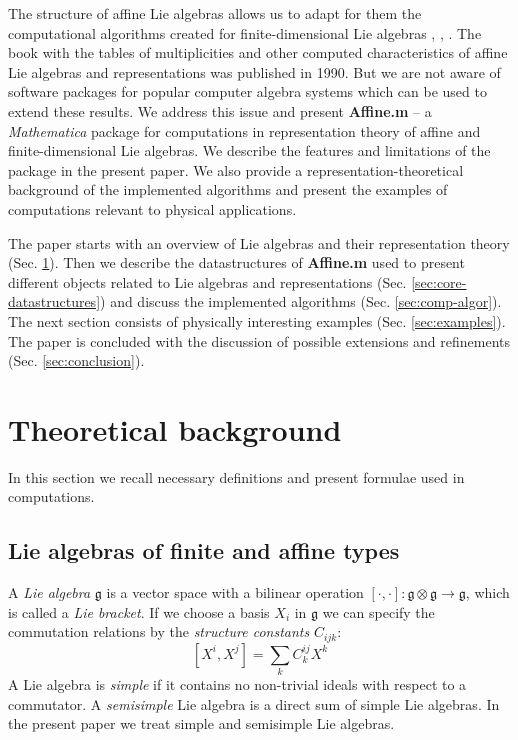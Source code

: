 \documentclass[preprint,12pt]{elsarticle}
\newcommand{\gf}{\mathfrak{g}}
\begin{document}
The structure of affine Lie algebras allows us to adapt for them the computational algorithms created for finite-dimensional Lie algebras  \cite{Fuchs:1996dd}, \cite{gannon2001algorithms}, \cite{kass1990ala}. The book \cite{kass1990ala} with the tables of multiplicities and other computed characteristics of affine Lie algebras and representations was published in 1990. But we are not aware of software packages for popular computer algebra systems which can be used to extend these results.
We address this issue and present {\bf Affine.m} -- a {\it Mathematica} package for computations in representation theory of affine and finite-dimensional Lie algebras.  We describe the features and limitations of the package in the present paper.  We also provide a representation-theoretical background of the implemented algorithms and present the examples of computations relevant to physical applications.

The paper starts with an overview of Lie algebras and their representation theory (Sec. \ref{sec:theor-backgr}). Then we describe the datastructures of {\bf Affine.m} used to present different objects related to Lie algebras and representations (Sec. \ref{sec:core-datastructures}) and discuss the implemented algorithms (Sec. \ref{sec:comp-algor}). The next section consists of physically interesting examples (Sec. \ref{sec:examples}). The paper is concluded with the discussion of possible extensions and refinements (Sec. \ref{sec:conclusion}).

\section{Theoretical background}
\label{sec:theor-backgr}

In this section we recall necessary definitions and present formulae used in computations. 

\subsection{Lie algebras of finite and affine types}
\label{sec:lie-algebras-finite}

A {\it Lie algebra} $\gf$ is a vector space with a bilinear operation $[\cdot,\cdot]:\gf\otimes\gf\to \gf$, which is called a {\it Lie bracket}. If we choose a basis $X_{i}$ in $\gf$ we can specify the commutation relations by the {\it structure constants} $C_{ijk}$:
\begin{equation}
  \label{eq:1}
  [X^{i},X^{j}]=\sum_{k} C^{ij}_{k} X^{k}
\end{equation}
A Lie algebra is {\it simple} if it contains no non-trivial ideals with respect to a commutator. A {\it semisimple} Lie algebra is a direct sum of simple Lie algebras. In the present paper we treat simple and semisimple Lie algebras. 
\end{document}
